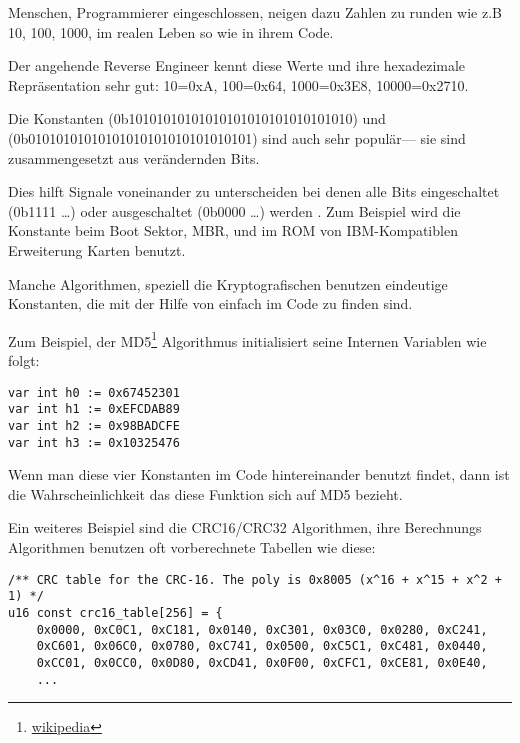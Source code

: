 
Menschen, Programmierer eingeschlossen, neigen dazu Zahlen zu runden wie z.B 10, 100, 1000,
im realen Leben so wie in ihrem Code.

Der angehende Reverse Engineer kennt diese Werte und ihre hexadezimale Repr\"asentation sehr gut:
10=0xA, 100=0x64, 1000=0x3E8, 10000=0x2710.

Die Konstanten  (0b10101010101010101010101010101010) und \\
 (0b01010101010101010101010101010101) sind auch sehr popul\"ar---
sie sind zusammengesetzt aus ver\"andernden Bits. %

Dies hilft Signale voneinander zu unterscheiden bei denen alle Bits eingeschaltet (0b1111 \dots) oder ausgeschaltet (0b0000 \dots) werden .
Zum Beispiel wird die Konstante  beim Boot Sektor, \ac{MBR},
und im \ac{ROM} von IBM-Kompatiblen Erweiterung Karten benutzt.

Manche Algorithmen, speziell die Kryptografischen benutzen eindeutige Konstanten, die mit der Hilfe von \IDA einfach im Code zu finden sind.

\newcommand{\URLMD}{http://go.yurichev.com/17111}

Zum Beispiel, der MD5\footnote{\href{\URLMD}{wikipedia}} Algorithmus initialisiert seine Internen Variablen wie folgt:


\begin{verbatim}
var int h0 := 0x67452301
var int h1 := 0xEFCDAB89
var int h2 := 0x98BADCFE
var int h3 := 0x10325476
\end{verbatim}

Wenn man diese vier Konstanten im Code hintereinander benutzt findet, dann ist die Wahrscheinlichkeit das diese Funktion 
sich auf MD5 bezieht.

\par Ein weiteres Beispiel sind die CRC16/CRC32 Algorithmen,
ihre Berechnungs Algorithmen benutzen oft vorberechnete Tabellen wie diese:

\begin{lstlisting}[caption=linux/lib/crc16.c,style=customc]
/** CRC table for the CRC-16. The poly is 0x8005 (x^16 + x^15 + x^2 + 1) */
u16 const crc16_table[256] = {
	0x0000, 0xC0C1, 0xC181, 0x0140, 0xC301, 0x03C0, 0x0280, 0xC241,
	0xC601, 0x06C0, 0x0780, 0xC741, 0x0500, 0xC5C1, 0xC481, 0x0440,
	0xCC01, 0x0CC0, 0x0D80, 0xCD41, 0x0F00, 0xCFC1, 0xCE81, 0x0E40,
	...
\end{lstlisting}

